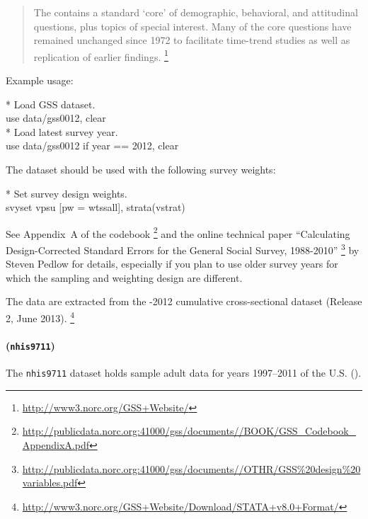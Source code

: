 \begin{quote}
	The \GSS contains a standard `core' of demographic, behavioral, and attitudinal questions, plus topics of special interest. Many of the core questions have remained unchanged since 1972 to facilitate time-trend studies as well as replication of earlier findings.%
	\footnote{\url{http://www3.norc.org/GSS+Website/}}
\end{quote}

Example usage:

\begin{docspec}
  * Load GSS dataset.\\%
  use data/gss0012, clear\\[1em]%
  * Load latest survey year.\\%
	use data/gss0012 if year == 2012, clear
\end{docspec}

The \GSS dataset should be used with the following survey weights:

\begin{docspec}
  * Set survey design weights.\\%
	svyset vpsu [pw = wtssall], strata(vstrat)
\end{docspec}


See Appendix~A of the \GSS codebook%
   \footnote{\url{http://publicdata.norc.org:41000/gss/documents//BOOK/GSS_Codebook_AppendixA.pdf}} %
   and the online technical paper ``Calculating Design-Corrected Standard Errors for the General Social Survey, 1988-2010''%
  \footnote{\url{http://publicdata.norc.org:41000/gss/documents//OTHR/GSS\%20design\%20variables.pdf}} %
   by Steven Pedlow for details, especially if you plan to use older survey years for which the sampling and weighting design are different.%

The data are extracted from the -2012 cumulative cross-sectional dataset (Release 2, June 2013).%
  \footnote{\url{http://www3.norc.org/GSS+Website/Download/STATA+v8.0+Format/}}

\paragraph{\nhis (\texttt{nhis9711})}

The \texttt{nhis9711} dataset holds sample adult data for years 1997--2011 of the U.S. \nhis (\NHIS).

